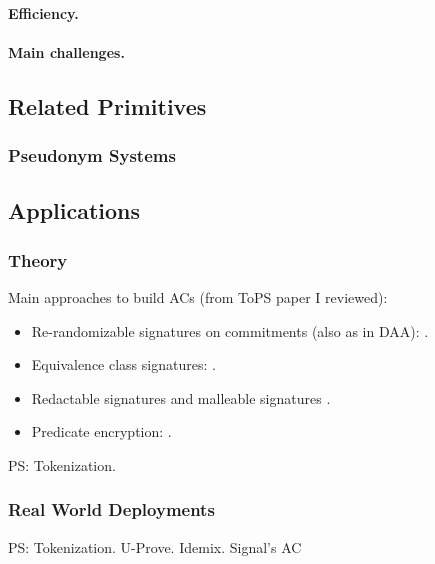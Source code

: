 \paragraph{Efficiency.}

\paragraph{Main challenges.}

\subsection{Related Primitives}

\subsubsection{Pseudonym Systems}
\label{sssec:pseudonyms}


\subsection{Applications}
\label{ssec:acapplication}

\subsubsection{Theory}
\label{sssec:actheoryapp}

Main approaches to build ACs (from ToPS paper I reviewed):

\begin{itemize}
\item Re-randomizable signatures on commitments (also as in DAA):
  \cite{cl02,cl04,lmpy16,ps16}.
\item Equivalence class signatures: \cite{fhs19,hs14}.
\item Redactable signatures \cite{cdhk15,sand20} and malleable signatures
  \cite{ckl14}.
\item Predicate encryption: \cite{dmm+18}.
\end{itemize}

PS: Tokenization.

\subsubsection{Real World Deployments}
\label{sssec:acrwdeploy}

PS: Tokenization.
U-Prove.
Idemix.
Signal's AC \cite{}


